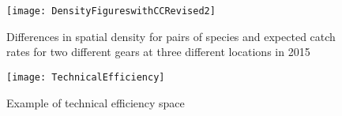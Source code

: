 \documentclass{nature}
\begin{document}
\begin{figure}
\begin{center}
	\texttt{[image: DensityFigureswithCCRevised2]}
	\label{fig:4}
	\caption{Differences in spatial density for pairs of species and
		expected catch rates for two different gears at three different
	locations in 2015}
\end{center}
\end{figure}

\begin{figure}
\begin{center}
	\texttt{[image: TechnicalEfficiency]}
	\label{fig:5}
	\caption{Example of technical efficiency space}
\end{center}
\end{figure}
\end{document}
